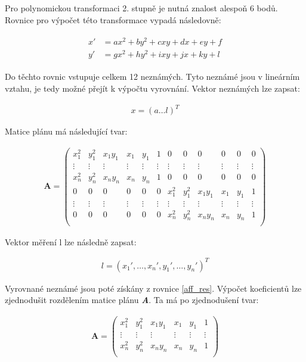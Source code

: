 \documentclass[thesis=M,czech]{FITthesis}[2012/06/26]
\begin{document}
Pro polynomickou transformaci 2. stupně je nutná znalost alespoň 6 bodů. Rovnice pro výpočet této transformace vypadá následovně:

\begin{align} \label{poly_2}
\begin{split}
x' &= ax^2 + by^2 + cxy + dx + ey + f \\
y' &= gx^2 + hy^2 + ixy +jx + ky +l 
\end{split}
\end{align}

Do těchto rovnic vstupuje celkem 12 neznámých. Tyto neznámé jsou v lineárním vztahu, je tedy možné přejít k výpočtu vyrovnání. Vektor neznámých lze zapsat:

\begin{align} \label{poly2_x}
x = (a \hdots l)^T
\end{align}

Matice plánu má následující tvar:

\setcounter{MaxMatrixCols}{20}
\begin{align} \label{poly_2_A}
\boldsymbol {A} = \begin{pmatrix}
 x_1^2 & y_1^2 &  x_1y_1 & x_1 & y_1 & 1 & 0 & 0 & 0 & 0 & 0 & 0 \\ 
 \vdots & \vdots & \vdots & \vdots & \vdots & \vdots & \vdots & \vdots & \vdots & \vdots & \vdots & \vdots  \\
    x_n^2 & y_n^2 & x_ny_n & x_n & y_n & 1 & 0 & 0 & 0 & 0 & 0 & 0 \\
    0 & 0 & 0 & 0 & 0 & 0 & x_1^2 & y_1^2 & x_1y_1 & x_1 & y_1 & 1 \\
     \vdots & \vdots & \vdots & \vdots & \vdots & \vdots & \vdots & \vdots & \vdots & \vdots & \vdots & \vdots  \\
    0 & 0 & 0 & 0 & 0 & 0 & x_n^2 & y_n^2 & x_ny_n & x_n & y_n & 1 \\
\end{pmatrix}
\end{align}


Vektor měření l lze následně zapsat:

\begin{align} \label{poly2_l}
l = (x_1', \ldots , x_n', y_1', \ldots , y_n')^T
\end{align}

Vyrovnané neznámé jsou poté získány z rovnice \eqref{aff_res}. Výpočet koeficientů lze zjednodušit rozdělením matice plánu \textbf{\textit{A}}. Ta má po zjednodušení tvar:

\begin{align} \label{poly2A_zjednodusena}
\boldsymbol {A} = \begin{pmatrix}
 x_1^2 & y_1^2 &  x_1y_1 & x_1 & y_1 & 1  \\ 
 \vdots & \vdots & \vdots & \vdots & \vdots & \vdots   \\
    x_n^2 & y_n^2 & x_ny_n & x_n & y_n & 1  \\
\end{pmatrix}
\end{align}
\end{document}
